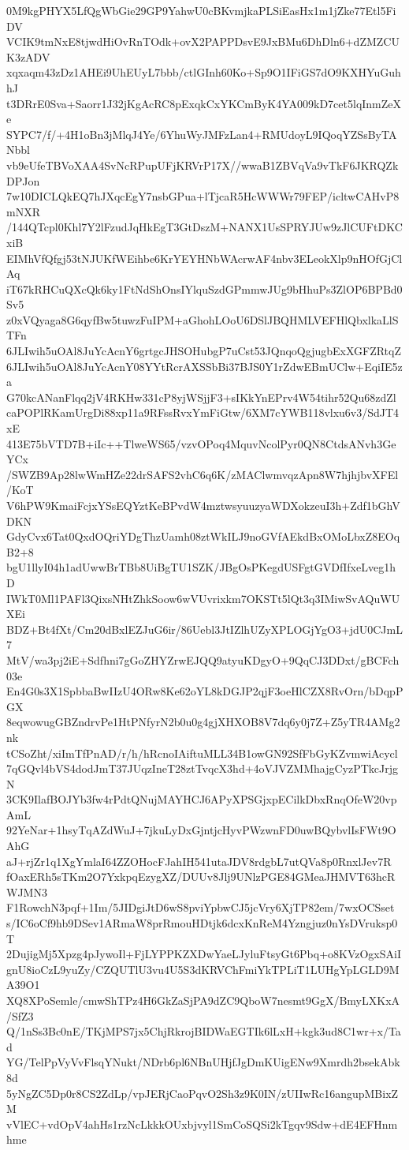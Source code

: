 0M9kgPHYX5LfQgWbGie29GP9YahwU0cBKvmjkaPLSiEasHx1m1jZke77Etl5FiDV
VCIK9tmNxE8tjwdHiOvRnTOdk+ovX2PAPPDsvE9JxBMu6DhDln6+dZMZCUK3zADV
xqxaqm43zDz1AHEi9UhEUyL7bbb/ctlGInh60Ko+Sp9O1IFiGS7dO9KXHYuGuhhJ
t3DRrE0Sva+Saorr1J32jKgAcRC8pExqkCxYKCmByK4YA009kD7cet5lqInmZeXe
SYPC7/f/+4H1oBn3jMlqJ4Ye/6YhuWyJMFzLan4+RMUdoyL9IQoqYZSsByTANbbl
vb9eUfeTBVoXAA4SvNcRPupUFjKRVrP17X//wwaB1ZBVqVa9vTkF6JKRQZkDPJon
7w10DICLQkEQ7hJXqcEgY7nsbGPua+lTjcaR5HcWWWr79FEP/icltwCAHvP8mNXR
/144QTcpl0Khl7Y2lFzudJqHkEgT3GtDszM+NANX1UsSPRYJUw9zJlCUFtDKCxiB
EIMhVfQfgj53tNJUKfWEihbe6KrYEYHNbWAcrwAF4nbv3ELeokXlp9nHOfGjClAq
iT67kRHCuQXcQk6ky1FtNdShOnsIYlquSzdGPmmwJUg9bHhuPs3ZlOP6BPBd0Sv5
z0xVQyaga8G6qyfBw5tuwzFuIPM+aGhohLOoU6DSlJBQHMLVEFHlQbxlkaLlSTFn
6JLIwih5uOAl8JuYcAcnY6grtgcJHSOHubgP7uCst53JQnqoQgjugbExXGFZRtqZ
6JLIwih5uOAl8JuYcAcnY08YYtRcrAXSSbBi37BJS0Y1rZdwEBmUClw+EqiIE5za
G70kcANanFlqq2jV4RKHw331cP8yjWSjjF3+sIKkYnEPrv4W54tihr52Qu68zdZl
caPOPlRKamUrgDi88xp11a9RFssRvxYmFiGtw/6XM7cYWB118vlxu6v3/SdJT4xE
413E75bVTD7B+iIc++TlweWS65/vzvOPoq4MquvNcolPyr0QN8CtdsANvh3GeYCx
/SWZB9Ap28lwWmHZe22drSAFS2vhC6q6K/zMAClwmvqzApn8W7hjhjbvXFEl/KoT
V6hPW9KmaiFcjxYSsEQYztKeBPvdW4mztwsyuuzyaWDXokzeuI3h+Zdf1bGhVDKN
GdyCvx6Tat0QxdOQriYDgThzUamh08ztWkILJ9noGVfAEkdBxOMoLbxZ8EOqB2+8
bgU1llyI04h1adUwwBrTBb8UiBgTU1SZK/JBgOsPKegdUSFgtGVDfIfxeLveg1hD
IWkT0Ml1PAFl3QixsNHtZhkSoow6wVUvrixkm7OKSTt5lQt3q3IMiwSvAQuWUXEi
BDZ+Bt4fXt/Cm20dBxlEZJuG6ir/86Uebl3JtIZlhUZyXPLOGjYgO3+jdU0CJmL7
MtV/wa3pj2iE+Sdfhni7gGoZHYZrwEJQQ9atyuKDgyO+9QqCJ3DDxt/gBCFch03e
En4G0s3X1SpbbaBwIIzU4ORw8Ke62oYL8kDGJP2qjF3oeHlCZX8RvOrn/bDqpPGX
8eqwowugGBZndrvPe1HtPNfyrN2b0u0g4gjXHXOB8V7dq6y0j7Z+Z5yTR4AMg2nk
tCSoZht/xiImTfPnAD/r/h/hRcnoIAiftuMLL34B1owGN92SfFbGyKZvmwiAcycl
7qGQvl4bVS4dodJmT37JUqzIneT28ztTvqcX3hd+4oVJVZMMhajgCyzPTkcJrjgN
3CK9IlafBOJYb3fw4rPdtQNujMAYHCJ6APyXPSGjxpECilkDbxRnqOfeW20vpAmL
92YeNar+1hsyTqAZdWuJ+7jkuLyDxGjntjcHyvPWzwnFD0uwBQybvlIsFWt9OAhG
aJ+rjZr1q1XgYmlaI64ZZOHocFJahIH541utaJDV8rdgbL7utQVa8p0RnxlJev7R
fOaxERh5sTKm2O7YxkpqEzygXZ/DUUv8Jlj9UNlzPGE84GMeaJHMVT63hcRWJMN3
F1RowchN3pqf+1Im/5JIDgiJtD6wS8pviYpbwCJ5jcVry6XjTP82em/7wxOCSset
s/IC6oCf9hb9DSev1ARmaW8prRmouHDtjk6dcxKnReM4Yzngjuz0nYsDVruksp0T
2DujigMj5Xpzg4pJywoIl+FjLYPPKZXDwYaeLJyluFtsyGt6Pbq+o8KVzOgxSAiI
gnU8ioCzL9yuZy/CZQUTlU3vu4U5S3dKRVChFmiYkTPLiT1LUHgYpLGLD9MA39O1
XQ8XPoSemle/cmwShTPz4H6GkZaSjPA9dZC9QboW7nesmt9GgX/BmyLXKxA/SfZ3
Q/1nSs3Bc0nE/TKjMPS7jx5ChjRkrojBIDWaEGTIk6lLxH+kgk3ud8C1wr+x/Tad
YG/TelPpVyVvFlsqYNukt/NDrb6pl6NBnUHjfJgDmKUigENw9Xmrdh2bsekAbk8d
5yNgZC5Dp0r8CS2ZdLp/vpJERjCaoPqvO2Sh3z9K0IN/zUIIwRc16angupMBixZM
vVlEC+vdOpV4ahHs1rzNcLkkkOUxbjvyl1SmCoSQSi2kTgqv9Sdw+dE4EFHnmhme
